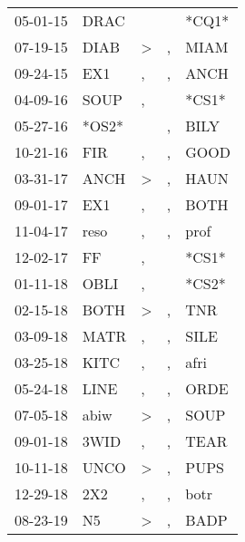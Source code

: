 \begin{supertabular}{p{0.07\textwidth}p{0.06\textwidth}p{0.02\textwidth}p{0.02\textwidth}p{0.06\textwidth}}
 05-01-15\textsuperscript{} &  DRAC\textsuperscript{} &               &    &                   *CQ1* \\
 07-19-15\textsuperscript{} &  DIAB\textsuperscript{} &  \textgreater &  , &  MIAM\textsuperscript{} \\
 09-24-15\textsuperscript{} &   EX1\textsuperscript{} &             , &  , &  ANCH\textsuperscript{} \\
 04-09-16\textsuperscript{} &  SOUP\textsuperscript{} &             , &    &                   *CS1* \\
 05-27-16\textsuperscript{} &                   *OS2* &               &  , &  BILY\textsuperscript{} \\
 10-21-16\textsuperscript{} &   FIR\textsuperscript{} &             , &  , &  GOOD\textsuperscript{} \\
 03-31-17\textsuperscript{} &  ANCH\textsuperscript{} &  \textgreater &  , &  HAUN\textsuperscript{} \\
 09-01-17\textsuperscript{} &   EX1\textsuperscript{} &             , &  , &  BOTH\textsuperscript{} \\
 11-04-17\textsuperscript{} &  reso\textsuperscript{} &             , &  , &  prof\textsuperscript{} \\
 12-02-17\textsuperscript{} &    FF\textsuperscript{} &             , &    &                   *CS1* \\
 01-11-18\textsuperscript{} &  OBLI\textsuperscript{} &             , &    &                   *CS2* \\
 02-15-18\textsuperscript{} &  BOTH\textsuperscript{} &  \textgreater &  , &   TNR\textsuperscript{} \\
 03-09-18\textsuperscript{} &  MATR\textsuperscript{} &             , &  , &  SILE\textsuperscript{} \\
 03-25-18\textsuperscript{} &  KITC\textsuperscript{} &             , &  , &  afri\textsuperscript{} \\
 05-24-18\textsuperscript{} &  LINE\textsuperscript{} &             , &  , &  ORDE\textsuperscript{} \\
 07-05-18\textsuperscript{} &  abiw\textsuperscript{} &  \textgreater &  , &  SOUP\textsuperscript{} \\
 09-01-18\textsuperscript{} &  3WID\textsuperscript{} &             , &  , &  TEAR\textsuperscript{} \\
 10-11-18\textsuperscript{} &  UNCO\textsuperscript{} &  \textgreater &  , &  PUPS\textsuperscript{} \\
 12-29-18\textsuperscript{} &   2X2\textsuperscript{} &             , &  , &  botr\textsuperscript{} \\
 08-23-19\textsuperscript{} &    N5\textsuperscript{} &  \textgreater &  , &  BADP\textsuperscript{} \\
\end{supertabular}

